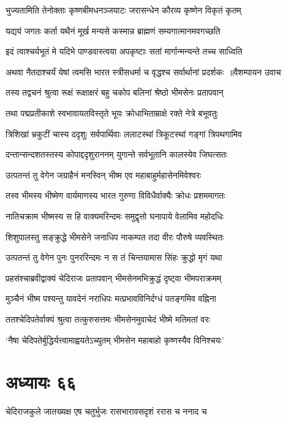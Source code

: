 \twolineshloka
{भुज्यतामिति तेनोक्ताः कृष्णबीमधनञ्जयाटः}
{जरासन्धेन कौरव्य कृष्णेन विकृतं कृतम्}


\twolineshloka
{यद्ययं जगतः कर्ता यथैनं मूर्ख मन्यसे}
{कस्मान्न ब्राह्मणं सम्यगात्मानमवगच्छति}


\twolineshloka
{इदं त्वाश्चर्यभूतं मे यदिभे पाण्डवास्त्वया}
{अपकृष्टाः सतां मार्गान्मन्यन्ते तच्च साध्विति}


\twolineshloka
{अथवा नैतदाश्चर्यं येषां त्वमसि भारत}
{स्त्रीसधर्मा च वृद्धश्च सर्वार्थानां प्रदर्शकः ॥वैशम्पायन उवाच}


\twolineshloka
{तस्य तद्वचनं श्रुत्वा रूक्षं रूक्षाक्षरं बहु}
{चकोप बलिनां श्रेष्ठो भीमसेनः प्रतापवान्}


\twolineshloka
{तथा पद्मप्रतीकाशे स्वभावायतविस्तृते}
{भूयः क्रोधाभिताम्राक्षे रक्ते नेत्रे बभूवतुः}


\twolineshloka
{त्रिशिखां भ्रकुटीं चास्य ददृशुः सर्वपार्थिवाः}
{ललाटस्थां त्रिकूटस्थां गङ्गां त्रिपथगामिव}


\twolineshloka
{दन्तान्सन्दशतस्तस्य कोपाद्ददृशुराननम्}
{युगान्ते सर्वभूतानि कालस्येव जिघत्सतः}


\twolineshloka
{उत्पतन्तं तु वेगेन जग्राहैनं मनस्विन्}
{भीष्म एव महाबाहुर्महासेनमिवेश्वरः}


\twolineshloka
{तस्व भीमस्य भीष्मेण वार्यमाणस्य भारत}
{गुरुणा विविधैर्वाक्यैः क्रोधः प्रशममागतः}


\twolineshloka
{नातिचक्राम भीष्मस्य स हि वाक्यमरिन्दमः}
{समुद्वृत्तो घनापाये वेलामिव महोदधिः}


\twolineshloka
{शिशुपालस्तु सङ्क्रुद्धे भीमसेने जनाधिप}
{नाकम्पत तदा वीरः पौरुषे व्यवस्थितः}


\twolineshloka
{उत्पतन्तं तु वेगेन पुनः पुनररिन्दमः}
{न स तं चिन्तयामास सिंहः क्रुद्धो मृगं यथा}


\twolineshloka
{प्रहसंश्चाब्रवीद्वाक्यं चेदिराजः प्रतापवान्}
{भीमसेनमभिक्रुद्धं दृष्ट्वा भीमपराक्रमम्}


\twolineshloka
{मुञ्चैनं भीष्म पश्यन्तु यावदेनं नराधिपः}
{मत्प्रभावविनिर्दग्धं पतङ्गमिव वह्निना}


\twolineshloka
{ततश्चेदिपतेर्वाक्यं श्रुत्वा तत्कुरुसत्तमः}
{भीमसेनमुवाचेदं भीष्मे मतिमतां वरः}


\twolineshloka
{`नैषा चेदिपतेर्बुद्धिर्यत्त्वामाह्वयतेऽच्युतम्}
{भीमसेन महाबाहो कृष्णस्यैव विनिश्चयः'}


\chapter{अध्यायः ६६}
\twolineshloka
{चेदिराजकुले जातख्यक्ष एष चतुर्भुजः}
{रासभारावसदृशं ररास च ननाद च}


